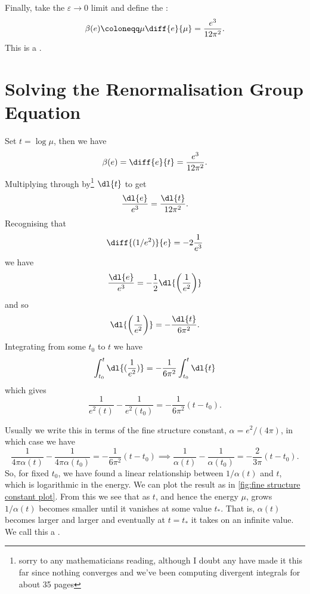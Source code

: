 \documentclass[fleqn]{NotesClass}
\begin{document}
    Finally, take the \(\varepsilon \to 0\) limit and define the \index{\(\beta\)}:
    \begin{equation}
        \beta(e) \coloneqq \mu \diff{e}{\mu} = \frac{e^3}{12\pi^2}.
    \end{equation}
    This is a .
    
    \section{Solving the Renormalisation Group Equation}
    Set \(t = \log \mu\), then we have
    \begin{equation}
        \beta(e) = \diff{e}{t} = \frac{e^3}{12\pi^2}.
    \end{equation}
    Multiplying through by\footnote{sorry to any mathematicians reading, although I doubt any have made it this far since nothing converges and we've been computing divergent integrals for about 35 pages} \(\dl{t}\) to get
    \begin{equation}
        \frac{\dl{e}}{e^3} = \frac{\dl{t}}{12\pi^2}.
    \end{equation}
    Recognising that
    \begin{equation}
        \diff{(1/e^2)}{e} = -2\frac{1}{e^3}
    \end{equation}
    we have
    \begin{equation}
        \frac{\dl{e}}{e^3} = -\frac{1}{2} \dl{\left( \frac{1}{e^2} \right)}
    \end{equation}
    and so
    \begin{equation}
        \dl{\left( \frac{1}{e^2} \right)} = -\frac{\dl{t}}{6\pi^2}.
    \end{equation}
    Integrating from some \(t_0\) to \(t\) we have
    \begin{equation}
        \int_{t_0}^{t} \dl{(\frac{1}{e^2})} = -\frac{1}{6\pi^2} \int_{t_0}^{t} \dl{t}
    \end{equation}
    which gives
    \begin{equation}
        \frac{1}{e^2(t)} - \frac{1}{e^2(t_0)} = - \frac{1}{6\pi^2}(t - t_0).
    \end{equation}
    
    Usually we write this in terms of the fine structure constant, \(\alpha = e^2/(4\pi)\), in which case we have
    \begin{equation}
        \frac{1}{4\pi\alpha(t)} - \frac{1}{4\pi\alpha(t_0)} = -\frac{1}{6\pi^2}(t - t_0) \implies \frac{1}{\alpha(t)} - \frac{1}{\alpha(t_0)} = -\frac{2}{3\pi}(t - t_0).
    \end{equation}
    So, for fixed \(t_0\), we have found a linear relationship between \(1/\alpha(t)\) and \(t\), which is logarithmic in the energy.
    We can plot the result as in \cref{fig:fine structure constant plot}.
    From this we see that as \(t\), and hence the energy \(\mu\), grows \(1/\alpha(t)\) becomes smaller until it vanishes at some value \(t_*\).
    That is, \(\alpha(t)\) becomes larger and larger and eventually at \(t = t_*\) it takes on an infinite value.
    We call this a .
    
\end{document}
